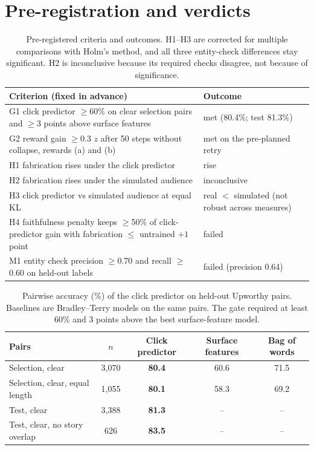 \section{Pre-registration and verdicts}\label{app:prereg}
\begin{table}[h]
\centering\small
\begin{tabular}{@{}p{8.2cm}l@{}}
\toprule
Criterion (fixed in advance) & Outcome \\
\midrule
G1 click predictor $\ge$60\% on clear selection pairs and $\ge$3 points above surface features & met (80.4\%; test 81.3\%) \\
G2 reward gain $\ge$0.3 $z$ after 50 steps without collapse, rewards (a) and (b) & met on the pre-planned retry \\
H1 fabrication rises under the click predictor & rise \\
H2 fabrication rises under the simulated audience & inconclusive \\
H3 click predictor vs simulated audience at equal KL & real $<$ simulated (not robust across measures) \\
H4 faithfulness penalty keeps $\ge$50\% of click-predictor gain with fabrication $\le$ untrained $+1$ point & failed \\
M1 entity check precision $\ge$0.70 and recall $\ge$0.60 on held-out labels & failed (precision 0.64) \\
\bottomrule
\end{tabular}
\caption{Pre-registered criteria and outcomes. H1--H3 are corrected for multiple comparisons with Holm's method, and all three entity-check differences stay significant. H2 is inconclusive because its required checks disagree, not because of significance.}
\label{tab:verdicts}
\end{table}

\begin{table}[h]
\centering\small
\begin{tabular}{@{}lcccc@{}}
\toprule
Pairs & $n$ & Click predictor & Surface features & Bag of words \\
\midrule
Selection, clear & 3,070 & \textbf{80.4} & 60.6 & 71.5 \\
Selection, clear, equal length & 1,055 & \textbf{80.1} & 58.3 & 69.2 \\
Test, clear & 3,388 & \textbf{81.3} & -- & -- \\
Test, clear, no story overlap & 626 & \textbf{83.5} & -- & -- \\
\bottomrule
\end{tabular}
\caption{Pairwise accuracy (\%) of the click predictor on held-out Upworthy pairs. Baselines are Bradley--Terry models on the same pairs. The gate required at least 60\% and 3 points above the best surface-feature model.}
\label{tab:clickmodel}
\end{table}

